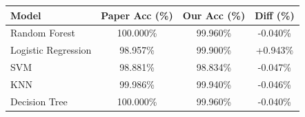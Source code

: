 \begin{tabular}{lccc}
\toprule
Model & Paper Acc (\%) & Our Acc (\%) & Diff (\%) \\ \midrule
Random Forest & 100.000\% & 99.960\% & -0.040\% \\
Logistic Regression & 98.957\% & 99.900\% & +0.943\% \\
SVM & 98.881\% & 98.834\% & -0.047\% \\
KNN & 99.986\% & 99.940\% & -0.046\% \\
Decision Tree & 100.000\% & 99.960\% & -0.040\% \\
\bottomrule
\end{tabular}
